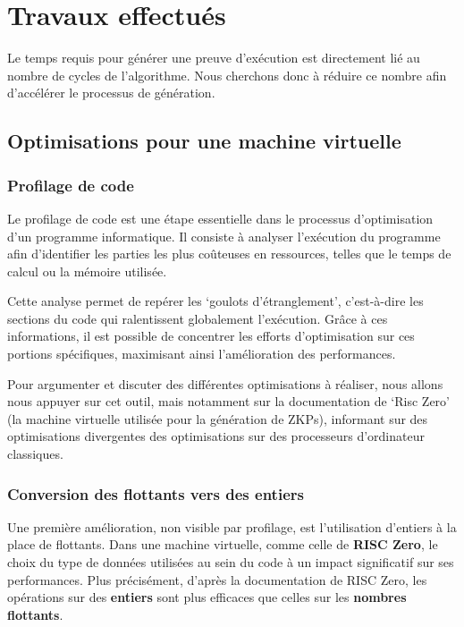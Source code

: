 \documentclass[12pt]{report}
\begin{document}
\chapter{Travaux effectués}

Le temps requis pour générer une preuve d'exécution est directement lié au nombre
de cycles de l'algorithme.
Nous cherchons donc à réduire ce nombre afin d'accélérer le processus de
génération.

\section{Optimisations pour une machine virtuelle}

\subsection{Profilage de code}

Le profilage de code est une étape essentielle dans le processus 
d'optimisation d'un programme informatique. Il consiste à analyser 
l'exécution du programme afin d'identifier les parties les plus 
coûteuses en ressources, telles que le temps de calcul ou la 
mémoire utilisée.

\medskip

Cette analyse permet de repérer les `goulots d'étranglement', 
c'est-à-dire les sections du code qui ralentissent 
globalement l'exécution. Grâce à ces informations, il 
est possible de concentrer les efforts d'optimisation sur 
ces portions spécifiques, maximisant ainsi l'amélioration 
des performances.

\medskip

Pour argumenter et discuter des différentes optimisations à réaliser,
nous allons nous appuyer sur cet outil, mais notamment sur la documentation
de `Risc Zero' \cite{risczero} (la machine virtuelle utilisée pour la génération de ZKPs), informant
sur des optimisations divergentes des optimisations sur des processeurs d'ordinateur classiques.

\subsection{Conversion des flottants vers des entiers}

Une première amélioration, non visible par profilage, est l'utilisation
d'entiers à la place de flottants. Dans une machine virtuelle, comme celle de 
\textbf{RISC Zero}, le choix du type de données utilisées au sein
du code à un impact significatif sur ses performances. Plus 
précisément, d'après la documentation de RISC Zero, les opérations 
sur des \textbf{entiers} sont plus efficaces que celles sur les \textbf{nombres flottants}. 
\end{document}
